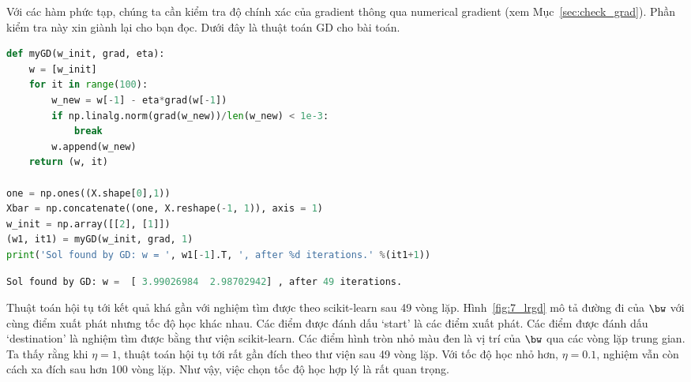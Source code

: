 Với các hàm phức tạp, chúng ta cần kiểm tra độ chính xác của gradient thông
qua numerical gradient (xem Mục~\ref{sec:check_grad}). Phần kiểm tra này xin giành lại cho bạn đọc. Dưới đây là thuật toán GD cho bài toán.
 
\begin{lstlisting}[language=Python]
def myGD(w_init, grad, eta):
    w = [w_init]
    for it in range(100):
        w_new = w[-1] - eta*grad(w[-1])
        if np.linalg.norm(grad(w_new))/len(w_new) < 1e-3:
            break 
        w.append(w_new)
    return (w, it)

one = np.ones((X.shape[0],1))
Xbar = np.concatenate((one, X.reshape(-1, 1)), axis = 1)
w_init = np.array([[2], [1]])
(w1, it1) = myGD(w_init, grad, 1)
print('Sol found by GD: w = ', w1[-1].T, ', after %d iterations.' %(it1+1))
\end{lstlisting}
\kq 
\begin{lstlisting}[language=Python]
Sol found by GD: w =  [ 3.99026984  2.98702942] , after 49 iterations.
\end{lstlisting}
 
Thuật toán hội tụ tới kết quả khá gần với nghiệm tìm được theo scikit-learn sau
49 vòng lặp. Hình~\ref{fig:7_lrgd} mô tả đường đi của $\bw$ với cùng điểm xuất
phát nhưng tốc độ học khác nhau. Các điểm được đánh dấu `start' là các điểm xuất
phát. Các điểm được đánh dấu `destination' là nghiệm tìm được bằng thư viện
scikit-learn. Các điểm hình tròn nhỏ màu đen là vị trí của $\bw$ qua các vòng
lặp trung gian. Ta thấy rằng khi $\eta = 1$, thuật toán hội tụ tới rất gần đích
theo thư viện sau 49 vòng lặp. Với tốc độ học nhỏ hơn, $\eta = 0.1$, nghiệm vẫn
còn cách xa đích sau hơn 100 vòng lặp. Như vậy, việc chọn tốc độ học hợp lý là
rất quan trọng.


